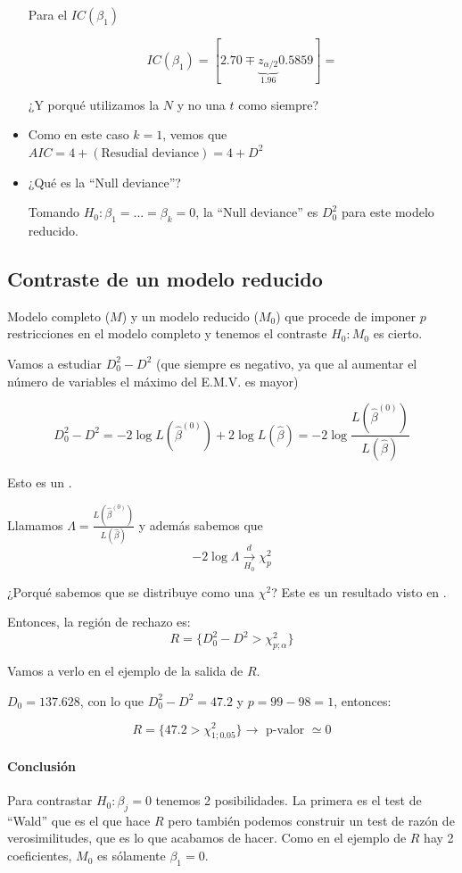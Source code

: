 \begin{example}
\begin{itemize}
  \subitem  Para el $IC(β_1)$

  \[
    IC(β_1) = [2.70 \mp \underbrace{z_{α/2}}_{1.96}0.5859] = 
  \]

  ¿Y porqué utilizamos la $N$ y no una $t$ como siempre? 


  \item Como en este caso $k=1$, vemos que $AIC = 4 + (\text{Resudial deviance}) = 4+D^2$
  \item ¿Qué es la ``Null deviance''? 

    \begin{defn}
    Tomando $H_0 : β_1 = ... = β_k = 0$, la ``Null deviance'' es $D_0^2$ para este modelo reducido.
    \end{defn}

\end{itemize}

\end{example}

\subsection{Contraste de un modelo reducido}

Modelo completo ($M$) y un modelo reducido ($M_0$) que procede de imponer $p$ restricciones en el modelo completo y tenemos el contraste $H_0 : M_0$ es cierto.

Vamos a estudiar $D_0^2 - D^2$ (que siempre es negativo, ya que al aumentar el número de variables el máximo del E.M.V. es mayor)

\[
D_0^2 - D^2  = -2 \log L(\hat{β}^{(0)}) + 2 \log L(\hat{β}) = -2\log\frac{L(\hat{β}^{(0)})}{L(\hat{β})}\] 

Esto es un . 

Llamamos $\Lambda = \frac{L(\hat{β}^{(0)})}{L(\hat{β})}$ y además sabemos que $$-2\log\Lambda\xrightarrow[H_0]{d}\chi^2_p$$


¿Porqué sabemos que se distribuye como una $\chi^2$? Este es un resultado visto en \cite[IV.4.3]{ApuntesEstI}.

Entonces, la región de rechazo es: \[R = \{D^2_0 - D^2 > \chi^2_{p;α}\}\]


Vamos a verlo en el ejemplo de la salida de $R$.

$D_0 = 137.628$, con lo que $D_0^2 - D^2  = 47.2$ y $p = 99-98 = 1$, entonces:

\[
R = \{47.2 > \chi^2_{1;0.05}\}\to \text{ p-valor } \simeq 0
\]

\paragraph{Conclusión}

Para contrastar $H_0 : β_j = 0$ tenemos 2 posibilidades. La primera es el test de ``Wald'' que es el que hace $R$ pero también podemos construir un test de razón de verosimilitudes, que es lo que acabamos de hacer. Como en el ejemplo de $R$ hay 2 coeficientes, $M_0$ es sólamente $β_1 = 0$.




